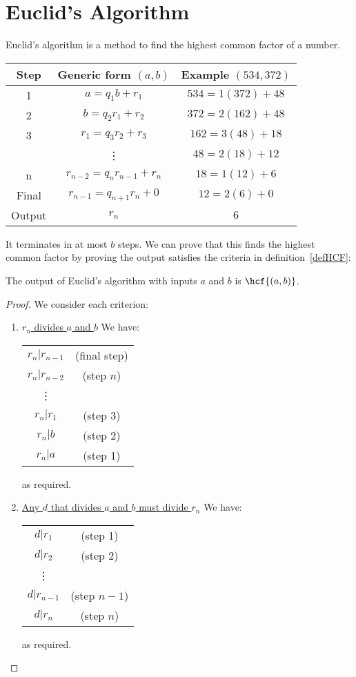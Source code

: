 \documentclass[../Main.tex]{subfiles}
\begin{document}
\section{Euclid's Algorithm}
Euclid's algorithm is a method to find the highest common factor of a number.\par
\begin{tabular}{c|c|c}
    Step & Generic form $(a, b)$ & Example $(534, 372)$ \\
    \hline
    1 & $a = q_1 b + r_1$ & $534 = 1(372) + 48$ \\
    2 & $b = q_2 r_1 + r_2$ & $372 = 2(162) + 48$ \\
    3 & $r_1 = q_3 r_2 + r_3$ & $162 = 3(48) + 18$ \\
   & \vdots & $48 = 2(18) + 12$ \\
    n & $r_{n-2} = q_n r_{n-1} + r_n$ & $18 = 1(12) + 6$ \\
    Final & $r_{n-1} = q_{n+1} r_n + 0$ & $12 = 2(6) + 0$ \\
    \hline
    Output & $r_n$ & $6$
\end{tabular}\par
It terminates in at most $b$ steps. We can prove that this finds the highest common factor by proving the output satisfies the criteria in definition~\ref{defHCF}:
\begin{theorem}
    The output of Euclid's algorithm with inputs $a$ and $b$ is $\hcf{(a, b)}$.
\end{theorem}
\begin{proof}
    We consider each criterion:
    \begin{enumerate}
        \item \underline{$r_n$ divides $a$ and $b$}
        We have:\par
        \begin{tabular}{c c}
            $r_n | r_{n-1}$ & (final step) \\
            $r_n | r_{n-2}$ & (step $n$) \\
            \vdots & \\
            $r_n | r_1$ & (step 3) \\
            $r_n | b$ & (step 2) \\
            $r_n | a$ & (step 1)
        \end{tabular}\par
        as required.
        \item \underline{Any $d$ that divides $a$ and $b$ must divide $r_n$}
        We have:\par
        \begin{tabular}{c c}
            $d | r_1$ & (step 1) \\
            $d | r_2$ & (step 2) \\
            \vdots & \\
            $d | r_{n-1}$ & (step $n-1$) \\
            $d | r_n$ & (step $n$)
        \end{tabular}\par
        as required.
    \end{enumerate}
\end{proof}
\end{document}
